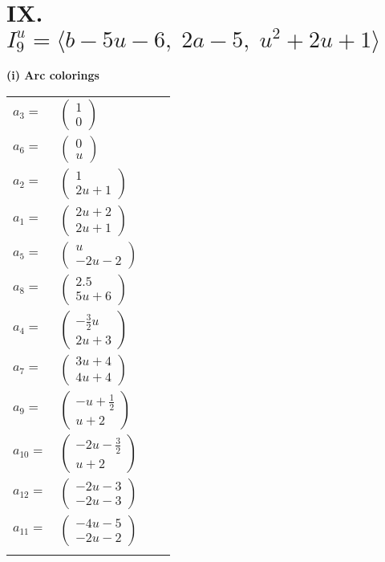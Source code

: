 \documentclass[1p]{elsarticle_modified}
\theoremstyle{definition}
\begin{document}
\centering \section*{IX. $I^u_{9}= \langle b-5 u-6,\;2 a-5,\;u^2+2 u+1 \rangle$}
\flushleft \textbf{(i) Arc colorings}\\
\begin{tabular}{m{7pt} m{180pt} m{7pt} m{180pt} }
\flushright $a_{3}=$&$\begin{pmatrix}1\\0\end{pmatrix}$ \\
\flushright $a_{6}=$&$\begin{pmatrix}0\\u\end{pmatrix}$ \\
\flushright $a_{2}=$&$\begin{pmatrix}1\\2 u+1\end{pmatrix}$ \\
\flushright $a_{1}=$&$\begin{pmatrix}2 u+2\\2 u+1\end{pmatrix}$ \\
\flushright $a_{5}=$&$\begin{pmatrix}u\\-2 u-2\end{pmatrix}$ \\
\flushright $a_{8}=$&$\begin{pmatrix}2.5\\5 u+6\end{pmatrix}$ \\
\flushright $a_{4}=$&$\begin{pmatrix}-\frac{3}{2} u\\2 u+3\end{pmatrix}$ \\
\flushright $a_{7}=$&$\begin{pmatrix}3 u+4\\4 u+4\end{pmatrix}$ \\
\flushright $a_{9}=$&$\begin{pmatrix}- u+\frac{1}{2}\\u+2\end{pmatrix}$ \\
\flushright $a_{10}=$&$\begin{pmatrix}-2 u-\frac{3}{2}\\u+2\end{pmatrix}$ \\
\flushright $a_{12}=$&$\begin{pmatrix}-2 u-3\\-2 u-3\end{pmatrix}$ \\
\flushright $a_{11}=$&$\begin{pmatrix}-4 u-5\\-2 u-2\end{pmatrix}$\\&\end{tabular}
\end{document}
